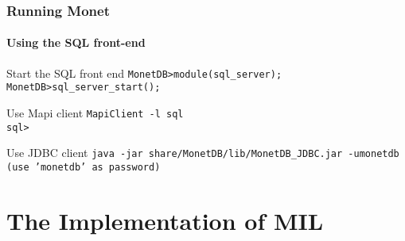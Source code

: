 \documentclass{beamer}
\begin{document}
\begin{frame}
  \frametitle{Running Monet}
  \framesubtitle{Using the SQL front-end}

  \begin{block}{Start the SQL front end}
  {\tt MonetDB>module(sql\_server);} \\
  {\tt MonetDB>sql\_server\_start();}
  \end{block}

  \pause

  \begin{block}{Use Mapi client}
  \alert{\tt MapiClient -l sql} \\
  {\tt sql>}
  \end{block}

  \pause

  \begin{block}{Use JDBC client}
  \alert{\tt java -jar share/MonetDB/lib/MonetDB\_JDBC.jar -umonetdb} \\
  {\tt (use 'monetdb' as password)}
  \end{block}

\end{frame}

\section{The Implementation of MIL}
\end{document}
